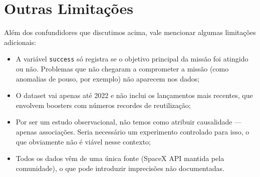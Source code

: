 \section{Outras Limitações}

Além dos confundidores que discutimos acima, vale mencionar algumas limitações adicionais:

\begin{itemize}
    \item A variável \texttt{success} só registra se o objetivo principal da missão foi atingido ou não. Problemas que não chegaram a comprometer a missão (como anomalias de pouso, por exemplo) não aparecem nos dados;

    \item O dataset vai apenas até 2022 e não inclui os lançamentos mais recentes, que envolvem boosters com números recordes de reutilização;

    \item Por ser um estudo observacional, não temos como atribuir causalidade — apenas associações. Seria necessário um experimento controlado para isso, o que obviamente não é viável nesse contexto;

    \item Todos os dados vêm de uma única fonte (SpaceX API mantida pela comunidade), o que pode introduzir imprecisões não documentadas.
\end{itemize}
